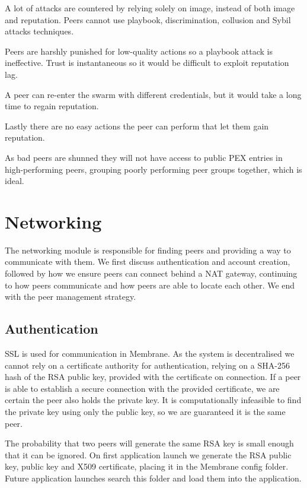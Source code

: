 \documentclass[11pt, a4paper, twocolumn, twoside]{report}
\begin{document}
A lot of attacks are countered by relying solely on image, instead of both image and reputation. Peers cannot use playbook, discrimination, collusion and Sybil attacks techniques. 

Peers are harshly punished for low-quality actions so a playbook attack is ineffective. Trust is instantaneous so it would be difficult to exploit reputation lag. 

A peer can re-enter the swarm with different credentials, but it would take a long time to regain reputation.

Lastly there are no easy actions the peer can perform that let them gain reputation.

As bad peers are shunned they will not have access to public PEX entries in high-performing peers, grouping poorly performing peer groups together, which is ideal.

\section{Networking}

The networking module is responsible for finding peers and providing a way to communicate with them. We first discuss authentication and account creation, followed by how we ensure peers can connect behind a NAT gateway, continuing to how peers communicate and how peers are able to locate each other. We end with the peer management strategy. 

\subsection{Authentication}

SSL is used for communication in Membrane. As the system is decentralised we cannot rely on a certificate authority for authentication, relying on a SHA-256 hash of the RSA public key, provided with the certificate on connection. If a peer is able to establish a secure connection with the provided certificate, we are certain the peer also holds the private key. \citep{menezes1996handbook} It is computationally infeasible to find the private key using only the public key, so we are guaranteed it is the same peer.

The probability that two peers will generate the same RSA key is small enough that it can be ignored. On first application launch we generate the RSA public key, public key and X509 certificate, placing it in the Membrane config folder. Future application launches search this folder and load them into the application.
\end{document}
